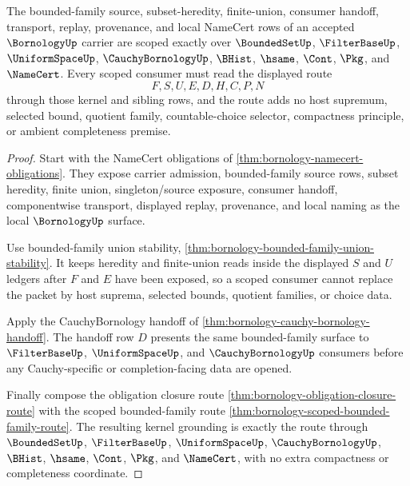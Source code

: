 \begin{theorem}
\label{thm:bornology-scope-kernel-grounding}
The bounded-family source, subset-heredity, finite-union, consumer handoff, transport, replay, provenance, and local NameCert rows of an accepted $\BornologyUp$ carrier are scoped exactly over $\BoundedSetUp$, $\FilterBaseUp$, $\UniformSpaceUp$, $\CauchyBornologyUp$, $\BHist$, $\hsame$, $\Cont$, $\Pkg$, and $\NameCert$. Every scoped consumer must read the displayed route
$$
F,S,U,E,D,H,C,P,N
$$
through those kernel and sibling rows, and the route adds no host supremum, selected bound, quotient family, countable-choice selector, compactness principle, or ambient completeness premise.
\end{theorem}
\begin{proof}
Start with the NameCert obligations of \autoref{thm:bornology-namecert-obligations}. They expose carrier admission, bounded-family source rows, subset heredity, finite union, singleton/source exposure, consumer handoff, componentwise transport, displayed replay, provenance, and local naming as the local $\BornologyUp$ surface.

Use bounded-family union stability, \autoref{thm:bornology-bounded-family-union-stability}. It keeps heredity and finite-union reads inside the displayed $S$ and $U$ ledgers after $F$ and $E$ have been exposed, so a scoped consumer cannot replace the packet by host suprema, selected bounds, quotient families, or choice data.

Apply the CauchyBornology handoff of \autoref{thm:bornology-cauchy-bornology-handoff}. The handoff row $D$ presents the same bounded-family surface to $\FilterBaseUp$, $\UniformSpaceUp$, and $\CauchyBornologyUp$ consumers before any Cauchy-specific or completion-facing data are opened.

Finally compose the obligation closure route \autoref{thm:bornology-obligation-closure-route} with the scoped bounded-family route \autoref{thm:bornology-scoped-bounded-family-route}. The resulting kernel grounding is exactly the route through $\BoundedSetUp$, $\FilterBaseUp$, $\UniformSpaceUp$, $\CauchyBornologyUp$, $\BHist$, $\hsame$, $\Cont$, $\Pkg$, and $\NameCert$, with no extra compactness or completeness coordinate.
\end{proof}

